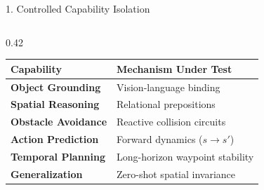 \documentclass[aspectratio=169, 10pt]{beamer}
\begin{document}
\begin{frame}{1. Controlled Capability Isolation}
\begin{columns}[T]
    \begin{column}{0.42\textwidth}
      \small
      \begin{tabular}{ll}
        \toprule
        \textbf{Capability} & \textbf{Mechanism Under Test} \\
        \midrule
        \textbf{Object Grounding} & Vision-language binding \\
        \textbf{Spatial Reasoning} & Relational prepositions \\
        \textbf{Obstacle Avoidance} & Reactive collision circuits \\
        \textbf{Action Prediction} & Forward dynamics ($s \to s'$) \\
        \textbf{Temporal Planning} & Long-horizon waypoint stability \\
        \textbf{Generalization} & Zero-shot spatial invariance \\
        \bottomrule
      \end{tabular}
    \end{column}
  \end{columns}
\end{frame}
\end{document}
